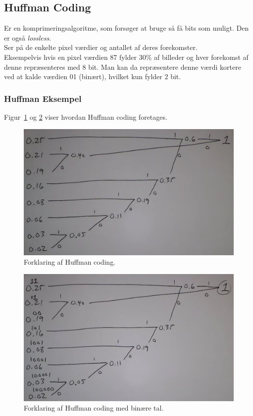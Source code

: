\subsection{Huffman Coding}

Er en komprimeringsalgoritme, som forsøger at bruge så få bits som muligt. Den er også \textit{lossless}.\\

Ser på de enkelte pixel værdier og antallet af deres forekomster.\\

Eksempelvis hvis en pixel værdien 87 fylder 30\% af billeder og hver forekomst af denne repræsenteres med 8 bit. Man kan da repræsentere denne værdi kortere ved at kalde værdien 01 (binært), hvilket kun fylder 2 bit.

\subsubsection{Huffman Eksempel}

Figur~\ref{fig:hoffman-coding-1} og \ref{fig:hoffman-coding-2} viser hvordan Huffman coding foretages.

\begin{figure}[H]
	\centering
	\includegraphics[width=0.8\linewidth]{figs/spm08/hoffman-coding-1}
	\caption{Forklaring af Huffman coding.}
	\label{fig:hoffman-coding-1}
\end{figure}

\begin{figure}[H]
	\centering
	\includegraphics[width=0.8\linewidth]{figs/spm08/hoffman-coding-2}
	\caption{Forklaring af Huffman coding med binære tal.}
	\label{fig:hoffman-coding-2}
\end{figure}

